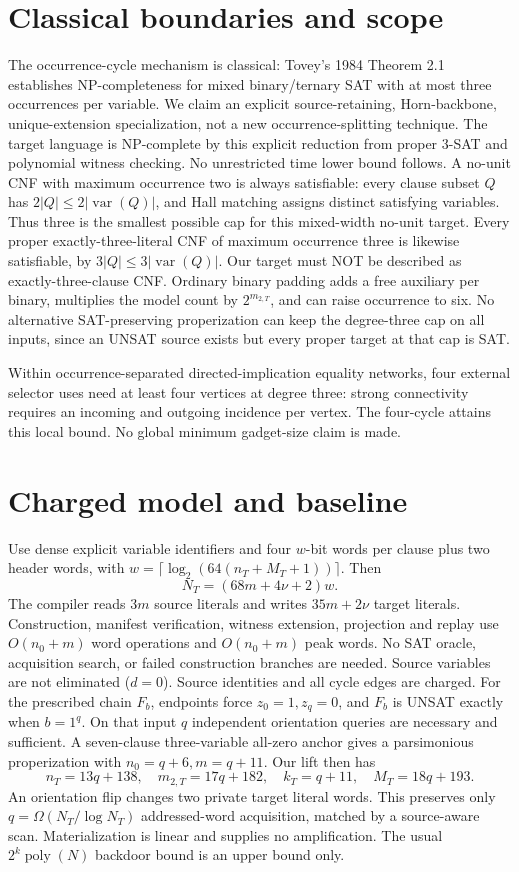 \documentclass[11pt]{article}
\begin{document}
\section{Classical boundaries and scope}
The occurrence-cycle mechanism is classical: Tovey's 1984 Theorem 2.1 establishes NP-completeness for mixed binary/ternary SAT with at most three occurrences per variable. We claim an explicit source-retaining, Horn-backbone, unique-extension specialization, not a new occurrence-splitting technique.
The target language is NP-complete by this explicit reduction from proper 3-SAT and polynomial witness checking. No unrestricted time lower bound follows.
A no-unit CNF with maximum occurrence two is always satisfiable: every clause subset $Q$ has $2|Q|\le2|\operatorname{var}(Q)|$, and Hall matching assigns distinct satisfying variables. Thus three is the smallest possible cap for this mixed-width no-unit target.
Every proper exactly-three-literal CNF of maximum occurrence three is likewise satisfiable, by $3|Q|\le3|\operatorname{var}(Q)|$. Our target must NOT be described as exactly-three-clause CNF.
Ordinary binary padding adds a free auxiliary per binary, multiplies the model count by $2^{m_{2,T}}$, and can raise occurrence to six. No alternative SAT-preserving properization can keep the degree-three cap on all inputs, since an UNSAT source exists but every proper target at that cap is SAT.

Within occurrence-separated directed-implication equality networks, four external selector uses need at least four vertices at degree three: strong connectivity requires an incoming and outgoing incidence per vertex. The four-cycle attains this local bound. No global minimum gadget-size claim is made.

\section{Charged model and baseline}
Use dense explicit variable identifiers and four $w$-bit words per clause plus two header words, with $w=\lceil\log_2(64(n_T+M_T+1))\rceil$. Then
\[
N_T=(68m+4\nu+2)w.
\]
The compiler reads $3m$ source literals and writes $35m+2\nu$ target literals. Construction, manifest verification, witness extension, projection and replay use $O(n_0+m)$ word operations and $O(n_0+m)$ peak words. No SAT oracle, acquisition search, or failed construction branches are needed. Source variables are not eliminated ($d=0$). Source identities and all cycle edges are charged.
For the prescribed chain $F_b$, endpoints force $z_0=1,z_q=0$, and $F_b$ is UNSAT exactly when $b=1^q$. On that input $q$ independent orientation queries are necessary and sufficient. A seven-clause three-variable all-zero anchor gives a parsimonious properization with $n_0=q+6,m=q+11$. Our lift then has
\[
n_T=13q+138,\quad m_{2,T}=17q+182,\quad k_T=q+11,\quad M_T=18q+193.
\]
An orientation flip changes two private target literal words. This preserves only $q=\Omega(N_T/\log N_T)$ addressed-word acquisition, matched by a source-aware scan. Materialization is linear and supplies no amplification. The usual $2^k\operatorname{poly}(N)$ backdoor bound is an upper bound only.
\end{document}
